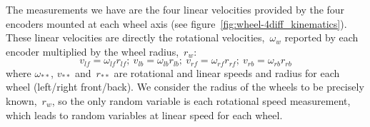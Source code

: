 The measurements we have are the four linear velocities provided by the four encoders mounted at each wheel axis (see figure~\ref{fig:wheel-4diff_kinematics}). These linear velocities are directly the rotational velocities,~$\omega_w$ reported by each encoder multiplied by the wheel radius,~$r_w$:
\begin{equation}
v_{lf} = \omega_{lf}r_{lf};\ v_{lb} = \omega_{lb}r_{lb};\ v_{rf} = \omega_{rf}r_{rf};\ v_{rb} = \omega_{rb}r_{rb}
\end{equation}
where $\omega_{**}$, $v_{**}$ and~$r_{**}$ are rotational and linear speeds and radius for each wheel (left/right front/back). We consider the radius of the wheels to be precisely known,~$r_w$, so the only random variable is each rotational speed measurement, which leads to random variables at linear speed for each wheel. 


